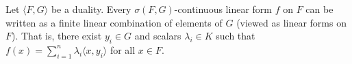 Let $\langle F, G \rangle$ be a duality. Every $\sigma(F, G)$-continuous linear form $f$ on $F$ can be written as a finite linear combination of elements of $G$ (viewed as linear forms on $F$). That is, there exist $y_i \in G$ and scalars $\lambda_i \in K$ such that $f(x) = \sum_{i=1}^{n} \lambda_i \langle x, y_i \rangle$ for all $x \in F$.

